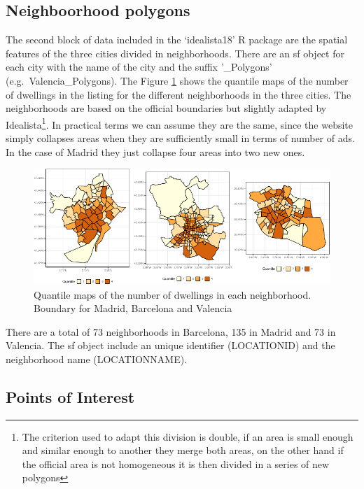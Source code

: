 \documentclass[Royal,times,sageh]{sagej}
\begin{document}
\hypertarget{neighboorhood-polygons}{%
\subsection{Neighboorhood polygons}\label{neighboorhood-polygons}}

The second block of data included in the `idealista18' R package are the
spatial features of the three cities divided in neighborhoods. There are
an sf object for each city with the name of the city and the suffix
'\_Polygons' (e.g.~Valencia\_Polygons). The Figure
\ref{fig:all-polygons} shows the quantile maps of the number of
dwellings in the listing for the different neighborhoods in the three
cities. The neighborhoods are based on the official boundaries but
slightly adapted by
Idealista\footnote{The criterion used to adapt this division is double, if an area is small enough and similar enough to another they merge both areas, on the other hand if the official area is not homogeneous it is then divided in a series of new polygons}.
In practical terms we can assume they are the same, since the website
simply collapses areas when they are sufficiently small in terms of
number of ads. In the case of Madrid they just collapse four areas into
two new ones.

\begin{figure}
\centering
\includegraphics{EPB_files/figure-latex/unnamed-chunk-1-1.pdf}
\caption{\label{fig:all-polygons}Quantile maps of the number of
dwellings in each neighborhood. Boundary for Madrid, Barcelona and
Valencia}
\end{figure}

There are a total of 73 neighborhoods in Barcelona, 135 in Madrid and 73
in Valencia. The sf object include an unique identifier (LOCATIONID) and
the neighborhood name (LOCATIONNAME).

\hypertarget{points-of-interest}{%
\subsection{Points of Interest}\label{points-of-interest}}
\end{document}
